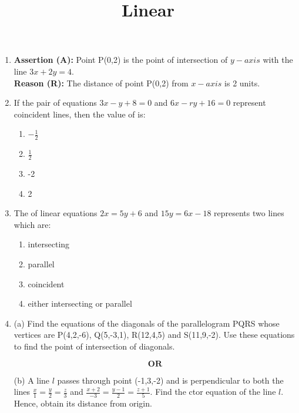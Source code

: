 \documentclass{article}
\title{\textbf{Linear}}
\date{}
\begin{document}
\maketitle

\begin{enumerate}

	\item \textbf{Assertion (A):} Point P(0,2) is the point of intersection of $y-axis$ with  the line $3x+2y=4$.\\
		\textbf{Reason (R):} The distance of point P(0,2) from $x-axis$ is 2 units.

	\item If the pair of equations $3x-y+8=0$ and $6x-ry+16=0$ represent coincident lines, then the value of  is:

		\begin{enumerate}
			\item $-\frac{1}{2}$
			\item $\frac{1}{2}$
			\item -2
			\item 2
		\end{enumerate}

	\item The of linear equations $2x=5y+6$ and $15y=6x-18$ represents two lines which are:

			\begin{enumerate}
				\item intersecting
				\item parallel
				\item coincident
				\item either intersecting or parallel
			\end{enumerate}

	\item (a) Find the equations of the diagonals of the parallelogram PQRS whose vertices are P(4,2,-6), Q(5,-3,1), R(12,4,5) and S(11,9,-2). Use these equations to find the point of intersection of diagonals.

		$$\textbf{OR}$$

		(b) A line $l$ passes through point (-1,3,-2) and is perpendicular to both the lines $\frac {x}{1}=\frac{y}{2}=\frac{z}{3}$ and $\frac {x+2}{-3}=\frac{y-1}{2}=\frac{z+1}{5}$. Find the ctor equation of the line $l$. Hence, obtain its distance from origin.

\end{enumerate}
\end{document}
